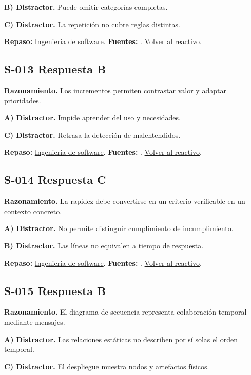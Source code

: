 \textbf{B) Distractor. }Puede omitir categorías completas.

\textbf{C) Distractor. }La repetición no cubre reglas distintas.

\textbf{Repaso:} \hyperref[sec:s1]{Ingeniería de software}. \textbf{Fuentes:} \cite{scrum,swebok}. \hyperref[q:S-012]{Volver al reactivo}.\par\medskip

\subsection*{S-013 \quad Respuesta B}\label{s:S-013}
\textbf{Razonamiento.} Los incrementos permiten contrastar valor y adaptar prioridades.

\textbf{A) Distractor. }Impide aprender del uso y necesidades.

\textbf{C) Distractor. }Retrasa la detección de malentendidos.

\textbf{Repaso:} \hyperref[sec:s1]{Ingeniería de software}. \textbf{Fuentes:} \cite{scrum,swebok}. \hyperref[q:S-013]{Volver al reactivo}.\par\medskip

\subsection*{S-014 \quad Respuesta C}\label{s:S-014}
\textbf{Razonamiento.} La rapidez debe convertirse en un criterio verificable en un contexto concreto.

\textbf{A) Distractor. }No permite distinguir cumplimiento de incumplimiento.

\textbf{B) Distractor. }Las líneas no equivalen a tiempo de respuesta.

\textbf{Repaso:} \hyperref[sec:s1]{Ingeniería de software}. \textbf{Fuentes:} \cite{scrum,swebok}. \hyperref[q:S-014]{Volver al reactivo}.\par\medskip

\subsection*{S-015 \quad Respuesta B}\label{s:S-015}
\textbf{Razonamiento.} El diagrama de secuencia representa colaboración temporal mediante mensajes.

\textbf{A) Distractor. }Las relaciones estáticas no describen por sí solas el orden temporal.

\textbf{C) Distractor. }El despliegue muestra nodos y artefactos físicos.

